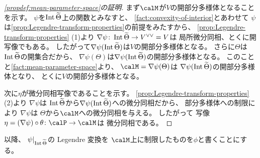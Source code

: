 \documentclass[report]{jlreq}
\begin{document}
\begin{proof}[\cref{propdef:mean-parameter-space}の証明]
    まず$\calM$が$V$の開部分多様体となることを示す。
    $\psi$を$\operatorname{Int} \widetilde{\Theta}$上の関数とみなすと、
    \cref{fact:convexity-of-interior}とあわせて
    $\psi$は\cref{prop:Legendre-transform-properties}の前提をみたすから、
    \cref{prop:Legendre-transform-properties} (1)より
    $\nabla \psi \colon \operatorname{Int} \widetilde{\Theta} \to V^{\vee\vee} = V$は
    局所微分同相、とくに開写像でもある。
    したがって$\nabla \psi(\operatorname{Int} \widetilde{\Theta})$は$V$の開部分多様体となる。
    さらに$\Theta$は$\operatorname{Int} \widetilde{\Theta}$の開集合だから、
    $\nabla \psi(\Theta)$は$\nabla \psi(\operatorname{Int} \widetilde{\Theta})$の開部分多様体となる。
    このことと\cref{fact:mean-parameter-space}より、
    $\calM = \nabla \psi(\Theta)$は
    $\nabla \psi(\operatorname{Int} \widetilde{\Theta})$の開部分多様体となり、
    とくに$V$の開部分多様体となる。

    次に$\eta$が微分同相写像であることを示す。
    \cref{prop:Legendre-transform-properties} (2)より
    $\nabla \psi$は
    $\operatorname{Int} \widetilde{\Theta}$から$\nabla \psi(\operatorname{Int} \widetilde{\Theta})$への微分同相だから、
    部分多様体への制限により
    $\nabla \psi$は
    $\Theta$から$\calM$への微分同相を与える。
    したがって
    写像$\eta = (\nabla \psi) \circ \theta \colon \calP \to \calM$は
    微分同相である。
\end{proof}

以降、
$\psi|_{\operatorname{Int} \widetilde{\Theta}}$の Legendre 変換を
$\calM$上に制限したものを$\phi$と書くことにする。
\end{document}
